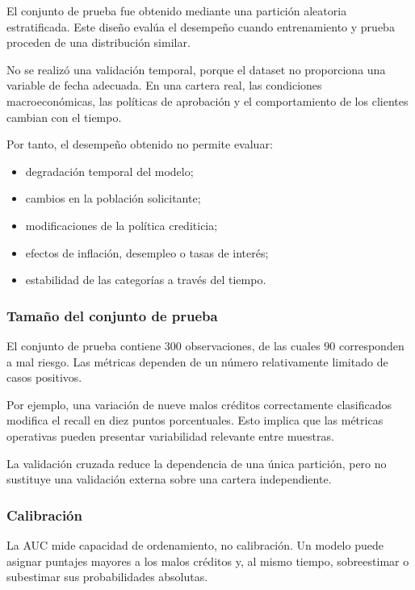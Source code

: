 El conjunto de prueba fue obtenido mediante una partición aleatoria
estratificada. Este diseño evalúa el desempeño cuando entrenamiento y
prueba proceden de una distribución similar.

No se realizó una validación temporal, porque el dataset no proporciona
una variable de fecha adecuada. En una cartera real, las condiciones
macroeconómicas, las políticas de aprobación y el comportamiento de los
clientes cambian con el tiempo.

Por tanto, el desempeño obtenido no permite evaluar:

\begin{itemize}
    \item degradación temporal del modelo;

    \item cambios en la población solicitante;

    \item modificaciones de la política crediticia;

    \item efectos de inflación, desempleo o tasas de interés;

    \item estabilidad de las categorías a través del tiempo.
\end{itemize}

\subsubsection{Tamaño del conjunto de prueba}

El conjunto de prueba contiene \(300\) observaciones, de las cuales
\(90\) corresponden a mal riesgo. Las métricas dependen de un número
relativamente limitado de casos positivos.

Por ejemplo, una variación de nueve malos créditos correctamente
clasificados modifica el recall en diez puntos porcentuales. Esto implica
que las métricas operativas pueden presentar variabilidad relevante entre
muestras.

La validación cruzada reduce la dependencia de una única partición, pero
no sustituye una validación externa sobre una cartera independiente.

\subsubsection{Calibración}

La AUC mide capacidad de ordenamiento, no calibración. Un modelo puede
asignar puntajes mayores a los malos créditos y, al mismo tiempo,
sobreestimar o subestimar sus probabilidades absolutas.

